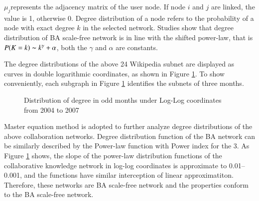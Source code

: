 \documentclass{elsarticle}
\begin{document}
$\mu_j$represents the adjacency matrix of the user node. If node $i$
and $j$ are linked, the value  is 1, otherwise 0. Degree distribution
of a node
refers to the probability of a node with exact degree $k$ in the
selected network. Studies show that degree distribution of BA
scale-free network is in line with the shifted power-law, that is
$P(K=k)\thicksim k^\gamma+\alpha$, both the $\gamma$ and $\alpha$ are 
constants. 


The degree distributions of the above 24 Wikipedia subnet are
displayed as curves in double logarithmic coordinates, as shown in
Figure \ref{fig:degree-distr}. To show conveniently, each subgraph in Figure \ref{fig:degree-distr} identifies
the subnets of three months.
\begin{figure}[htpb]
 
  \centering
  \subfigure[ ]{
     \scalebox{0.18}{\texttt{[image: 02-1]}}
   } \quad
  \subfigure[ ]{ 
       \scalebox{0.18}{\texttt{[image: 02-2]}}
   } 
   
    \subfigure[ ]{
     \scalebox{0.18}{\texttt{[image: 02-3]}}
   } \quad
  \subfigure[ ]{ 
       \scalebox{0.18}{\texttt{[image: 02-4]}}
   } 
  
    \subfigure[ ]{
     \scalebox{0.18}{\texttt{[image: 02-5]}}
   } \quad
  \subfigure[ ]{ 
       \scalebox{0.18}{\texttt{[image: 02-6]}}
   } 

    \subfigure[ ]{
     \scalebox{0.18}{\texttt{[image: 02-7]}}
   } \quad
  \subfigure[ ]{ 
       \scalebox{0.18}{\texttt{[image: 02-8]}}
   } 
   \caption{Distribution of degree in odd months under Log-Log
     coordinates from 2004 to 2007}
    \label{fig:degree-distr}
\end{figure}

Master equation method is adopted to further analyze degree
distributions of the above collaboration networks\cite{PhysRevLett.85.4633}. Degree
distribution function of the BA network can be similarly described by
the Power-law function with Power index for the 3. As Figure \ref{fig:degree-distr} shows,
the slope of the power-law distribution functions of the 
collaborative knowledge network in log-log coordinates is approximate
to 0.01--0.001, and the functions have similar interception of 
linear approximatiton. Therefore, these networks are  BA scale-free network and the properties  conform to the
BA scale-free network.
\end{document}

